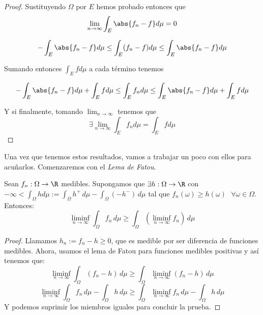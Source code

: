 \begin{proof}
  Sustituyendo $\Omega$  por $E$ hemos probado entonces que
  $$\lim_{n \to \infty} \int_{E} \abs{f_n - f} d \mu = 0$$

  $$- \int_E \abs{f_n - f} d \mu \leq \int_E (f_n - f) d \mu \leq \int_E \abs{f_n - f} d \mu$$

  Sumando entonces $\displaystyle \int_E f d \mu$ a cada término tenemos

  $$ - \int_E \abs{f_n - f} d \mu + \int_E f d \mu \leq \int_E f_n d \mu \leq \int_E \abs{f_n - f} d \mu + \int_E f d \mu$$

  Y si finalmente, tomando $\lim_{n \to \infty}$ tenemos que
  $$ \exists \lim_{n \to \infty} \int_E f_n d \mu = \int_E f d \mu$$
\end{proof}

Una vez que tenemos estos resultados, vamos a trabajar un poco con ellos para acuñarlos. Comenzaremos con el \textit{Lema de Fatou}.


\begin{nprop}
  Sean $f_n: \Omega \to \R$ medibles. Supongamos que $\exists h: \Omega \to \R$ con $-\infty < \int_\Omega h d\mu := \int_\Omega h^+\, d\mu - \int_\Omega (-h^-)\, d\mu $ tal que $f_n(\omega) \geq h(\omega) \ \ \ \forall \omega \in \Omega$.\\
  Entonces:
  $$ \liminf_{n\to \infty}\int_\Omega f_n\, d\mu \geq \int_\Omega (\liminf_{n\to \infty}f_n )\,d\mu$$
\end{nprop}
\begin{proof}
  Llamamos $h_n:= f_n - h \geq 0$, que es medible por ser diferencia de funciones medibles. Ahora, usamos el lema de Fatou para funciones medibles positivas y así tenemos que:
  $$ \liminf_{n\to \infty} \int_\Omega (f_n -h)\, d\mu \geq \int_\Omega \liminf_{n\to \infty}(f_n - h)\, d\mu$$
  $$  \liminf_{n\to \infty}\int_\Omega f_n\, d\mu   - \int_\Omega h\, d\mu \geq \int_\Omega \liminf_{n\to \infty} f_n\, d\mu - \int_\Omega h\, d\mu$$
  Y podemos suprimir los miembros iguales para concluir la prueba.
\end{proof}


